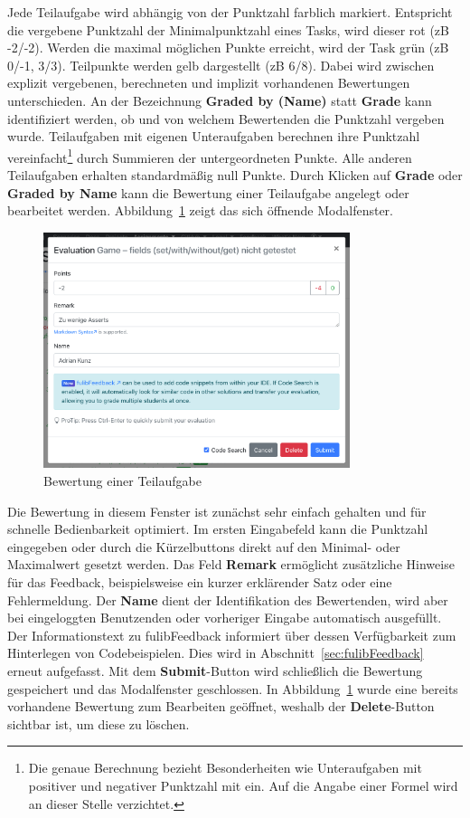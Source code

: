 Jede Teilaufgabe wird abhängig von der Punktzahl farblich markiert.
Entspricht die vergebene Punktzahl der Minimalpunktzahl eines Tasks, wird dieser rot (\ac{zB} -2/-2).
Werden die maximal möglichen Punkte erreicht, wird der Task grün (\ac{zB} 0/-1, 3/3).
Teilpunkte werden gelb dargestellt (\ac{zB} 6/8).
Dabei wird zwischen explizit vergebenen, berechneten und implizit vorhandenen Bewertungen unterschieden.
An der Bezeichnung \textbf{Graded by (Name)} statt \textbf{Grade} kann identifiziert werden, ob und von welchem Bewertenden die Punktzahl vergeben wurde.
Teilaufgaben mit eigenen Unteraufgaben berechnen ihre Punktzahl vereinfacht\footnote{
    Die genaue Berechnung bezieht Besonderheiten wie Unteraufgaben mit positiver und negativer Punktzahl mit ein.
    Auf die Angabe einer Formel wird an dieser Stelle verzichtet.
} durch Summieren der untergeordneten Punkte.
Alle anderen Teilaufgaben erhalten standardmäßig null Punkte.
Durch Klicken auf \textbf{Grade} oder \textbf{Graded by Name} kann die Bewertung einer Teilaufgabe angelegt oder bearbeitet werden.
Abbildung~\ref{fig:evaluation-modal} zeigt das sich öffnende Modalfenster.

\begin{figure}
    \centering
    \includegraphics[width=0.8\textwidth]{images/evaluation-modal}
    \caption{Bewertung einer Teilaufgabe}
    \label{fig:evaluation-modal}
\end{figure}

Die Bewertung in diesem Fenster ist zunächst sehr einfach gehalten und für schnelle Bedienbarkeit optimiert.
Im ersten Eingabefeld kann die Punktzahl eingegeben oder durch die Kürzelbuttons direkt auf den Minimal- oder Maximalwert gesetzt werden.
Das Feld \textbf{Remark} ermöglicht zusätzliche Hinweise für das Feedback, beispielsweise ein kurzer erklärender Satz oder eine Fehlermeldung.
Der \textbf{Name} dient der Identifikation des Bewertenden, wird aber bei eingeloggten Benutzenden oder vorheriger Eingabe automatisch ausgefüllt.
Der Informationstext zu fulibFeedback informiert über dessen Verfügbarkeit zum Hinterlegen von Codebeispielen.
Dies wird in Abschnitt~\ref{sec:fulibFeedback} erneut aufgefasst.
Mit dem \textbf{Submit}-Button wird schließlich die Bewertung gespeichert und das Modalfenster geschlossen.
In Abbildung~\ref{fig:evaluation-modal} wurde eine bereits vorhandene Bewertung zum Bearbeiten geöffnet, weshalb der \textbf{Delete}-Button sichtbar ist, um diese zu löschen.

